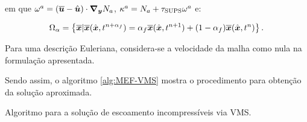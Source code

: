 \noindent em que $\omega^{a}=\left({\overline{\boldsymbol{u}}-\hat{\boldsymbol{u}}}\right)\cdot\boldsymbol{\nabla_y} N_{a}$, $\kappa^{a}=N_a+\tau_{\mathrm{SUPS}}\omega^{a}$ e:

\begin{equation}
    \Omega_\alpha=\left\{\overline{\boldsymbol{x}}|\overline{\boldsymbol{x}}(\hat{\boldsymbol{x}},t^{n+\alpha_f})=\alpha_f\overline{\boldsymbol{x}}(\hat{\boldsymbol{x}},t^{n+1})+(1-\alpha_f)\overline{\boldsymbol{x}}(\hat{\boldsymbol{x}},t^n)\right\}\text{.}
\end{equation}

Para uma descrição Euleriana, considera-se a velocidade da malha como nula na formulação apresentada.

Sendo assim, o algoritmo \ref{alg:MEF-VMS} mostra o procedimento para obtenção da solução aproximada.

\begin{algorithm}[h!]
    \caption{Algoritmo para a solução de escoamento incompressíveis via VMS.}
    \label{alg:MEF-VMS}
\end{algorithm}
